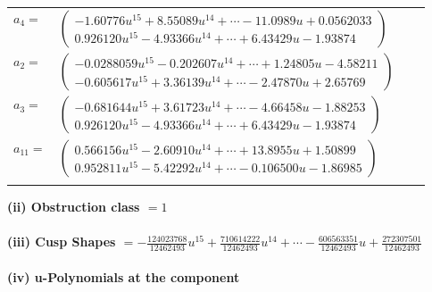 \documentclass[1p]{elsarticle_modified}
\theoremstyle{definition}
\begin{document}
\begin{tabular}{m{7pt} m{180pt} m{7pt} m{180pt} }
\flushright $a_{4}=$&$\begin{pmatrix}-1.60776 u^{15}+8.55089 u^{14}+\cdots-11.0989 u+0.0562033\\0.926120 u^{15}-4.93366 u^{14}+\cdots+6.43429 u-1.93874\end{pmatrix}$ \\
\flushright $a_{2}=$&$\begin{pmatrix}-0.0288059 u^{15}-0.202607 u^{14}+\cdots+1.24805 u-4.58211\\-0.605617 u^{15}+3.36139 u^{14}+\cdots-2.47870 u+2.65769\end{pmatrix}$ \\
\flushright $a_{3}=$&$\begin{pmatrix}-0.681644 u^{15}+3.61723 u^{14}+\cdots-4.66458 u-1.88253\\0.926120 u^{15}-4.93366 u^{14}+\cdots+6.43429 u-1.93874\end{pmatrix}$ \\
\flushright $a_{11}=$&$\begin{pmatrix}0.566156 u^{15}-2.60910 u^{14}+\cdots+13.8955 u+1.50899\\0.952811 u^{15}-5.42292 u^{14}+\cdots-0.106500 u-1.86985\end{pmatrix}$\\&\end{tabular}
\flushleft \textbf{(ii) Obstruction class $= 1$}\\~\\
\flushleft \textbf{(iii) Cusp Shapes $= -\frac{124023768}{12462493} u^{15}+\frac{710614222}{12462493} u^{14}+\cdots-\frac{606563351}{12462493} u+\frac{272307501}{12462493}$}\\~\\
\newpage\renewcommand{\arraystretch}{1}
\flushleft \textbf{(iv) u-Polynomials at the component}\newline \\
\end{document}
